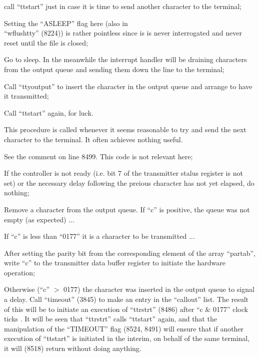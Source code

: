 \item[8561:] call ``ttstart'' just in case it is
time to send another character to
the terminal;

\item[8562:] Setting the ``ASLEEP'' flag here
(also in\\
``wflushtty'' (8224)) is
rather pointless since is is
never interrogated and never
reset until the file is closed;

\item[8563:] Go to sleep. In the meanwhile the
interrupt handler will be draining characters from the output
queue and sending them down the
line to the terminal;

\item[8566:] Call ``ttyoutput'' to insert the
character in the output queue and
arrange to have it transmitted;

\item[8568:] Call ``ttstart'' again, for luck.
\ed


This procedure is called whenever it
seems reasonable to try and send the
next character to the terminal. It
often achieves nothing useful.

\bd
\item[8514:] See the comment on line 8499.
This code is not relevant here;

\item[8518:] If the controller is not ready
(i.e. bit 7 of the transmitter
stalus register is not set) or
the necessary delay following the
preious character has not yet
elapsed, do nothing;

\item[8520:] Remove a character from the output queue. If ``c'' is positive,
the queue was not empty (as
expected) ...

\item[8521:] If ``c'' is less than ``0177'' it is
a character to be transmitted ...

\item[8522:] After setting the parity bit from
the corresponding element of the
array ``partab'', write ``c'' to the
transmitter data buffer register
to initiate the hardware operation;

\item[8524:] Otherwise (``c'' $>$ 0177)
the character was inserted in the output
queue to signal a delay. Call
``timeout'' (3845) to make an entry
in the ``callout'' list. The
result of this will be to initiate an execution of ``ttrstrt''
(8486) after ``c \& 0177'' clock
ticks . It will be seen that
``ttrstrt'' calls ``ttstart'' again,
and that the manipulation of the ``TIMEOUT''
flag (8524, 8491) will
ensure that if another execution
of ``ttstart'' is initiated in the
interim, on behalf of the same
terminal, it will (8518) return
without doing anything.
\ed

